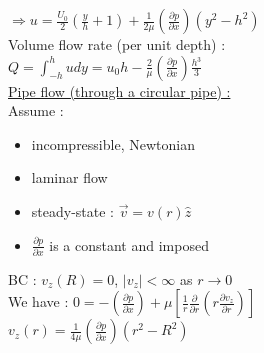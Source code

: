 \documentclass[../main.tex]{subfiles}
\begin{document}
$\Rightarrow u = \frac{U_0}{2}(\frac{y}{h}+1) + \frac{1}{2\mu}(\frac{\partial p}{\partial x})(y^2-h^2)$\\

Volume flow rate (per unit depth) : \\
$Q = \int_{-h}^h udy = u_0h-\frac{2}{\mu}(\frac{\partial p}{\partial x}) \frac{h^3}{3}$\\

\quad \underline{Pipe flow (through a circular pipe) :}\\
Assume : \begin{itemize}
    \item incompressible, Newtonian\\
    \item laminar flow\\
    \item steady-state : $\Vec{v} = v(r) \hat{z}$\\
    \item $\frac{\partial p}{\partial x}$ is a constant and imposed\\
\end{itemize}

BC : $v_z(R) = 0$, $\lvert v_z \rvert < \infty$ as $r\to 0$\\

We have : $0 = -(\frac{\partial p}{\partial x}) + \mu[\frac{1}{r}\frac{\partial}{\partial r}(r\frac{\partial v_z}{\partial r})]$\\
$v_z(r) = \frac{1}{4\mu} (\frac{\partial p}{\partial x})(r^2-R^2)$\\
\end{document}
